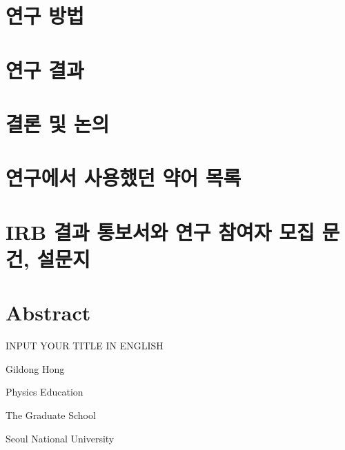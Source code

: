 \documentclass[12pt]{report}
\begin{document}
\chapter{연구 방법}\label{methods}


\chapter{연구 결과}\label{results}


\chapter{결론 및 논의}


\clearpage
\printbibliography[title={참고문헌}]
%
%

\appendix %
\chapter{연구에서 사용했던 약어 목록}


\chapter{IRB 결과 통보서와 연구 참여자 모집 문건, 설문지}


\chapter*{Abstract}%

\begin{center}
  \begin{huge}
    INPUT YOUR TITLE IN ENGLISH
  \end{huge}
\end{center}

\begin{flushright}
  \begin{large}
    Gildong Hong

    Physics Education
    
    The Graduate School
    
    Seoul National University    
  \end{large}
\end{flushright}
\end{document}
